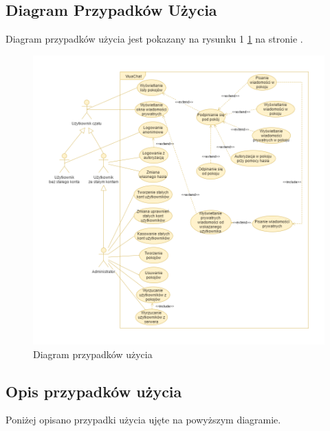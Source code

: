 \newpage
\subsection{Diagram Przypadków Użycia}

Diagram przypadków użycia jest pokazany na rysunku 1 \ref{diagram_przypadkow_uzycia}  na stronie \pageref{diagram_przypadkow_uzycia}.
\begin{figure}[!htp]
	\centering
	\includegraphics[width=\textwidth]{chat/fig/viuavm-dpu-v2}
	\caption{Diagram przypadków użycia}
	\label{diagram_przypadkow_uzycia}
\end{figure}

\newpage

\subsection{Opis przypadków użycia}

Poniżej opisano przypadki użycia ujęte na powyższym diagramie.


